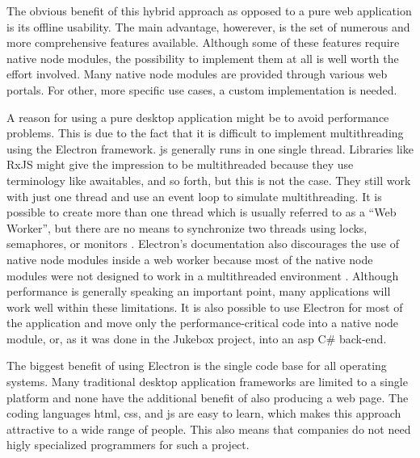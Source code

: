 The obvious benefit of this hybrid approach as opposed to a pure web application is its offline usability.  The main advantage, howerever, is the set of numerous and more comprehensive features available. Although some of these features require native node modules, the possibility to implement them at all is well worth the effort involved. Many native node modules are provided through various web portals. For other, more specific use cases, a custom implementation is needed.


A reason for using a pure desktop application might be to avoid performance problems. This is due to the fact that it is difficult to implement multithreading using the Electron framework. \gls{js} generally runs in one single thread. Libraries like RxJS might give the impression to be multithreaded because they use terminology like awaitables, and so forth, but this is not the case. They still work with just one thread and use an event loop to simulate multithreading. It is possible to create more than one thread which is usually referred to as a \enquote{Web Worker}, but there are no means to synchronize two threads using locks, semaphores, or monitors \cite{jsWebWorkers}. Electron's documentation also discourages the use of native node modules inside a web worker because most of the native node modules were not designed to work in a multithreaded environment \cite{electronMultithreading}. Although performance is generally speaking an important point, many applications will work well within these limitations. It is also possible to use Electron for most of the application and move only the performance-critical code into a native node module, or, as it was done in the Jukebox project, into an \gls{asp} C\# back-end.

The biggest benefit of using Electron is the single code base for all operating systems. Many traditional desktop application frameworks are limited to a single platform and none have the additional benefit of also producing a web page. The coding languages \gls{html}, \gls{css}, and \gls{js} are easy to learn, which makes this approach attractive to a wide range of people. This also means that companies do not need higly specialized programmers for such a project.
